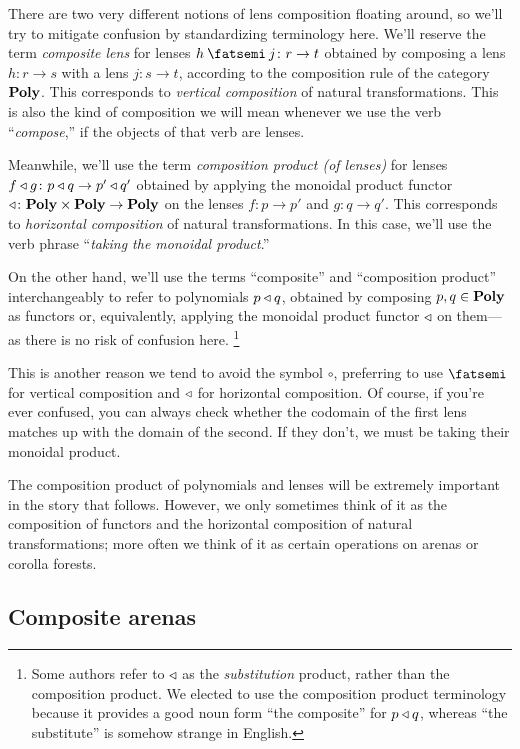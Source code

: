 \documentclass[Book-Poly]{subfiles}
\begin{document}
\begin{remark}
There are two very different notions of lens composition floating around, so we'll try to mitigate confusion by standardizing terminology here.
We'll reserve the term \emph{composite lens} for lenses $h\then j\colon r\to t$ obtained by composing a lens $h\colon r\to s$ with a lens $j\colon s\to t$, according to the composition rule of the category $\mathbf{Poly}$.
This corresponds to \emph{vertical composition} of natural transformations.
This is also the kind of composition we will mean whenever we use the verb ``\emph{compose},'' if the objects of that verb are lenses.

Meanwhile, we'll use the term \emph{composition product (of lenses)} for lenses $f\mathbin{\triangleleft} g\colon p\mathbin{\triangleleft} q\to p'\mathbin{\triangleleft} q'$ obtained by applying the monoidal product functor $\mathbin{\triangleleft}\colon\mathbf{Poly}\times\mathbf{Poly}\to\mathbf{Poly}$ on the lenses $f\colon p\to p'$ and $g\colon q\to q'$.
This corresponds to \emph{horizontal composition} of natural transformations.
In this case, we'll use the verb phrase ``\emph{taking the monoidal product}.''

On the other hand, we'll use the terms ``composite'' and ``composition product'' interchangeably to refer to polynomials $p\mathbin{\triangleleft} q$, obtained by composing $p,q\in\mathbf{Poly}$ as functors or, equivalently, applying the monoidal product functor $\mathbin{\triangleleft}$ on them---as there is no risk of confusion here.%
\footnote{Some authors refer to $\mathbin{\triangleleft}$ as the \emph{substitution} product, rather than the composition product. We elected to use the composition product terminology because it provides a good noun form ``the composite'' for $p\mathbin{\triangleleft} q$, whereas ``the substitute'' is somehow strange in English.}

This is another reason we tend to avoid the symbol $\circ$, preferring to use $\then$ for vertical composition and $\mathbin{\triangleleft}$ for horizontal composition.
Of course, if you're ever confused, you can always check whether the codomain of the first lens matches up with the domain of the second.
If they don't, we must be taking their monoidal product.
\end{remark}

The composition product of polynomials and lenses will be extremely important in the story that follows.
However, we only sometimes think of it as the composition of functors and the horizontal composition of natural transformations; more often we think of it as certain operations on arenas or corolla forests.

\subsection{Composite arenas}\label{subsec.comon.comp.def.arena}
\end{document}
